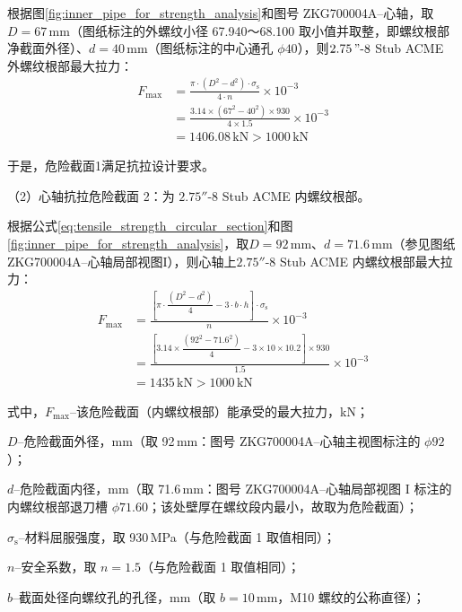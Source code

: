 根据图\ref{fig:inner_pipe_for_strength_analysis}和图号 ZKG700004A--心轴，取$D=67\,\textrm{mm}$（图纸标注的外螺纹小径 67.940～68.100 取小值并取整，即螺纹根部净截面外径）、$d=40\,\textrm{mm}$（图纸标注的中心通孔 $\phi 40$），则$2.75\,\text{''} \text{-}8$ Stub ACME 外螺纹根部最大拉力：
\begin{equation}
    \begin{aligned}
        F_{\max} &= \frac{\pi \cdot (D^2 - d^2) \cdot \sigma_{\mathrm{s}}}{4 \cdot n} \times 10^{-3}  \\
        &= \frac{3.14 \times (67^2 - 40^2) \times 930}{4 \times 1.5} \times 10^{-3}  \\
        &= 1406.08 \, \text{kN} > 1000 \, \text{kN}
    \end{aligned}
\end{equation}

于是，危险截面1满足抗拉设计要求。

（2）心轴抗拉危险截面 2：为 $2.75''\text{-}8$ Stub ACME 内螺纹根部。

根据公式\ref{eq:tensile_strength_circular_section}和图\ref{fig:inner_pipe_for_strength_analysis}，取$D=92\,\textrm{mm}$、$d=71.6\,\textrm{mm}$（参见图纸ZKG700004A--心轴局部视图I），则心轴上$2.75''\text{-}8$ Stub ACME 内螺纹根部最大拉力：
\begin{equation}
    \begin{aligned}
    F_{\text{max}} &= \frac{\left[\pi \cdot \dfrac{(D^2-d^2)}{4} - 3\cdot b\cdot h\right] \cdot \sigma_{\mathrm{s}}}{n} \times 10^{-3} \\
    &= \frac{\left[3.14 \times \dfrac{(92^2-71.6^2)}{4} - 3 \times 10 \times 10.2\right] \times 930}{1.5} \times 10^{-3} \\
    &= 1435\,\text{kN} > 1000\,\text{kN}
    \end{aligned}
\end{equation}

式中，$F_{\max}$--该危险截面（内螺纹根部）能承受的最大拉力，kN；

$D$--危险截面外径，mm（取 92\,mm：图号 ZKG700004A--心轴主视图标注的 $\phi 92$）；

$d$--危险截面内径，mm（取 71.6\,mm：图号 ZKG700004A--心轴局部视图 I 标注的内螺纹根部退刀槽 $\phi 71.60$；该处壁厚在螺纹段内最小，故取为危险截面）；

$\sigma_{\mathrm{s}}$--材料屈服强度，取 930\,MPa（与危险截面 1 取值相同）；

$n$--安全系数，取 $n = 1.5$（与危险截面 1 取值相同）；

$b$--截面处径向螺纹孔的孔径，mm（取 $b=10$\,mm，M10 螺纹的公称直径）；

